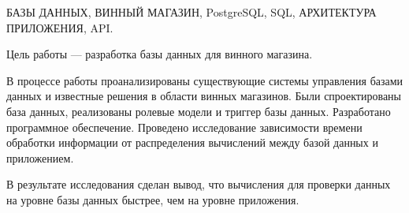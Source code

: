 \begin{essay}{}
БАЗЫ ДАННЫХ, ВИННЫЙ МАГАЗИН, PostgreSQL, SQL, АРХИТЕКТУРА ПРИЛОЖЕНИЯ, API.

Цель работы ---  разработка базы данных для винного магазина.

В процессе работы проанализированы существующие системы управления базами данных и известные решения в области винных магазинов. Были спроектированы база данных, реализованы ролевые модели и триггер базы данных. Разработано программное обеспечение. Проведено исследование зависимости времени обработки информации от распределения вычислений между базой данных и приложением. 

В результате исследования сделан вывод, что вычисления для проверки данных на уровне базы данных быстрее, чем на уровне приложения.
\end{essay}
